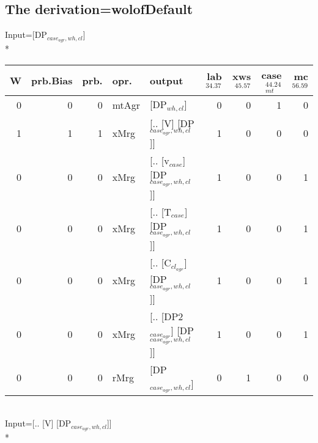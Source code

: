 \subsection{The derivation=wolofDefault}

\begingroup\scriptsize Input=[DP$_{case_{agr},wh,cl}$]\\*
\begin{tabularx}{\linewidth}{rrrlXrrrr}
\hline
   W &   prb.Bias &   prb. & opr.    & output                                  &   lab$^{34.37}$ &   xws$^{45.57}$ &   case$_{mt}^{44.24}$ &   mc$^{56.59}$ \\
\hline
   0 &       0 &   0 & mtAgr & [DP$_{wh,cl}$]                              &             0 &             0 &                 1 &            0 \\
   1 &       1 &   1 & xMrg  & [.. [V] [DP$_{case_{agr},wh,cl}$]]            &             1 &             0 &                 0 &            0 \\
   0 &       0 &   0 & xMrg  & [.. [v$_{case}$] [DP$_{case_{agr},wh,cl}$]]       &             1 &             0 &                 0 &            1 \\
   0 &       0 &   0 & xMrg  & [.. [T$_{case}$] [DP$_{case_{agr},wh,cl}$]]       &             1 &             0 &                 0 &            1 \\
   0 &       0 &   0 & xMrg  & [.. [C$_{cl_{agr}}$] [DP$_{case_{agr},wh,cl}$]]     &             1 &             0 &                 0 &            1 \\
   0 &       0 &   0 & xMrg  & [.. [DP2$_{case_{agr}}$] [DP$_{case_{agr},wh,cl}$]] &             1 &             0 &                 0 &            1 \\
   0 &       0 &   0 & rMrg  & [DP$_{case_{agr},wh,cl}$]                     &             0 &             1 &                 0 &            0 \\
\hline
\end{tabularx}\endgroup\\
\begingroup\scriptsize Input=[.. [V] [DP$_{case_{agr},wh,cl}$]]\\*
